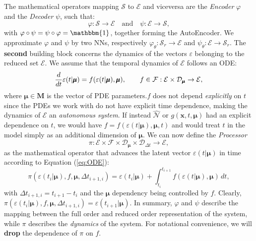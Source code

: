 The mathematical operators mapping $\mathcal{S}$ to $\mathcal{E}$ and viceversa are the \textit{Encoder} $\varphi$ and the \textit{Decoder} $\psi$, such that:
\begin{equation}
    \varphi: \mathcal{S}\rightarrow\mathcal{E}\quad\text{and}\quad\psi: \mathcal{E}\rightarrow\mathcal{S},
    \label{eq:AE}
\end{equation}
with $\varphi\circ\psi=\psi\circ\varphi= \mathbbm{1}$, together forming the AutoEncoder. We approximate $\varphi$ and $\psi$ by two NNs, respectively $\varphi_\theta:\mathcal{S}_r\rightarrow\mathcal{E}$ and $\psi_\theta:\mathcal{E}\rightarrow\mathcal{S}_r$.
The \textbf{second} building block concerns the dynamics of the vectors $\varepsilon$ belonging to the reduced set $\mathcal{E}$. We assume that the temporal dynamics of $\mathcal{E}$ follows an ODE:
\begin{equation}
    \frac{d}{dt}\varepsilon(t|\pmb{\mu})=f(\varepsilon(t|\pmb{\mu}),\pmb{\mu}),\quad\text\quad f\in\mathcal{F}:\mathcal{E}\times\mathcal{D}_{\pmb{\mu}}\rightarrow\mathcal{E},
    \label{eq:ODE}
\end{equation}
where $\pmb{\mu}\in\pmb{M}$ is the vector of PDE parameters.$f$ does not depend \textit{explicitly} on $t$ since the PDEs we work with do not have explicit time dependence, making the dynamics of $\mathcal{E}$ an \textit{autonomous system}. If instead $\hat{\mathcal{N}}$ or $g(\mathbf{x},t,\pmb{\mu})$ had an explicit dependence on $t$, we would have $f = f(\varepsilon(t|\pmb{\mu}),\pmb{\mu},t)$ and would treat $t$ in the model simply as an additional dimension of $\pmb{\mu}$. We can now define the \textit{Processor}
\begin{equation}
\label{eq:processor}
    \pi:\mathcal{E}\times\mathcal{F}\times\mathcal{D}_{\pmb{\mu}}\times\mathcal{D}_{\Delta t}\rightarrow \mathcal{E},
\end{equation} as the mathematical operator that advances the latent vector $\varepsilon(t|\pmb{\mu})$ in time according to Equation (\ref{eq:ODE}):
\begin{equation}
    \pi(\varepsilon(t_i|\pmb{\mu}),f,\pmb{\mu},\Delta t_{i+1,i}) = \varepsilon(t_i|\pmb{\mu})+\int_{t_i}^{t_{i+1}}f(\varepsilon(t|\pmb{\mu}),\pmb{\mu}) \,dt,
    \label{eq:NODE}
\end{equation}
with $\Delta t_{i+1,i} = t_{i+1}-t_i$ and the $\pmb{\mu}$ dependency being controlled by $f$. Clearly, $\pi(\varepsilon(t_i|\pmb{\mu}),f,\pmb{\mu},\Delta t_{i+1,i})= \varepsilon(t_{i+1}|\pmb{\mu})$. In summary, $\varphi$ and $\psi$ describe the mapping between the full order and reduced order representation of the system, while $\pi$ describes the \textit{dynamics} of the system. For notational convenience, we will \textbf{drop} the dependence of $\pi$ on $f$.

